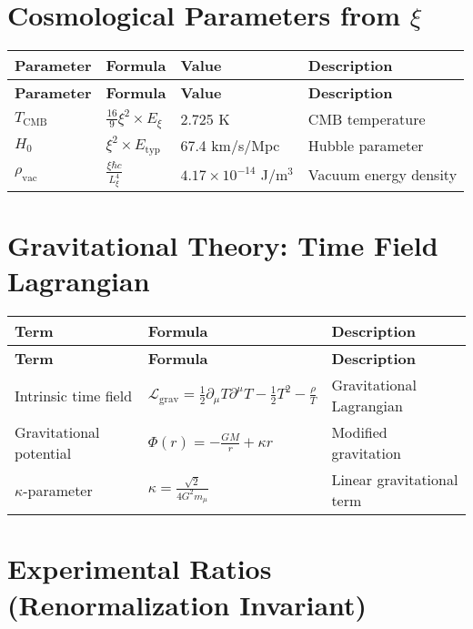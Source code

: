 \documentclass[12pt,a4paper]{article}
\begin{document}
	\section{Cosmological Parameters from \(\xi\)}
	
	\begin{longtable}{|p{3cm}|p{4cm}|p{4cm}|p{4cm}|}
		\hline
		\textbf{Parameter} & \textbf{Formula} & \textbf{Value} & \textbf{Description} \\
		\hline
		\endfirsthead
		\hline
		\textbf{Parameter} & \textbf{Formula} & \textbf{Value} & \textbf{Description} \\
		\hline
		\endhead
		\(T_{\text{CMB}}\) & \(\frac{16}{9}\xi^{2} \times E_{\xi}\) & 2.725 K & CMB temperature \\
		\hline
		\(H_0\) & \(\xi^{2} \times E_{\text{typ}}\) & 67.4 km/s/Mpc & Hubble parameter \\
		\hline
		\(\rho_{\text{vac}}\) & \(\frac{\xi\hbar c}{L_{\xi}^{4}}\) & \(4.17 \times 10^{-14}\) J/m\(^3\) & Vacuum energy density \\
		\hline
	\end{longtable}
	
	\section{Gravitational Theory: Time Field Lagrangian}
	
	\begin{longtable}{|p{4cm}|p{5cm}|p{5cm}|}
		\hline
		\textbf{Term} & \textbf{Formula} & \textbf{Description} \\
		\hline
		\endfirsthead
		\hline
		\textbf{Term} & \textbf{Formula} & \textbf{Description} \\
		\hline
		\endhead
		Intrinsic time field & \(\mathcal{L}_{\text{grav}} = \frac{1}{2}\partial_{\mu}T\partial^{\mu}T - \frac{1}{2}T^{2} - \frac{\rho}{T}\) & Gravitational Lagrangian \\
		\hline
		Gravitational potential & \(\Phi(r) = -\frac{GM}{r} + \kappa r\) & Modified gravitation \\
		\hline
		\(\kappa\)-parameter & \(\kappa = \frac{\sqrt{2}}{4G^{2}m_{\mu}}\) & Linear gravitational term \\
		\hline
	\end{longtable}
	
	\section{Experimental Ratios (Renormalization Invariant)}
	
\end{document}
